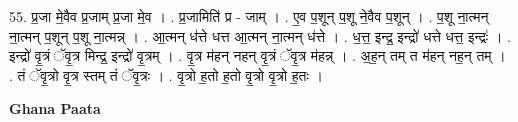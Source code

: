 \documentclass[17pt]{extarticle}
\begin{document}
55. प्र॒जा मे॒वैव प्र॒जाम् प्र॒जा मे॒व । . प्र॒जामिति॑ प्र - जाम् । . ए॒व प॒शून् प॒शू ने॒वैव प॒शून् । . प॒शू ना॒त्मन् ना॒त्मन् प॒शून् प॒शू ना॒त्मन्न् । . आ॒त्मन् ध॑त्ते धत्त आ॒त्मन् ना॒त्मन् ध॑त्ते । . ध॒त्त॒ इन्द्र॒ इन्द्रो॑ धत्ते धत्त॒ इन्द्रः॑ । . इन्द्रो॑ वृ॒त्रं ॅवृ॒त्र मिन्द्र॒ इन्द्रो॑ वृ॒त्रम् । . वृ॒त्र म॑हन् नहन् वृ॒त्रं ॅवृ॒त्र म॑हन्न् । . अ॒ह॒न् तम् त म॑हन् नह॒न् तम् । . तं ॅवृ॒त्रो वृ॒त्र स्तम् तं ॅवृ॒त्रः । . वृ॒त्रो ह॒तो ह॒तो वृ॒त्रो वृ॒त्रो ह॒तः । \newline

\textbf{Ghana Paata } \newline
\end{document}
